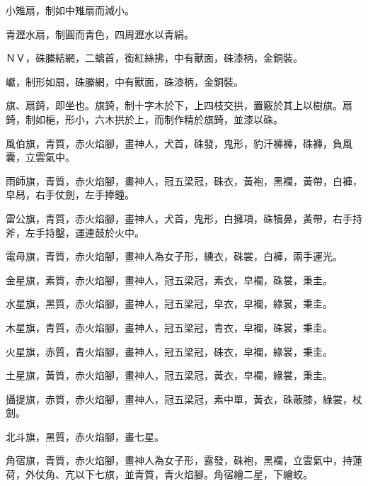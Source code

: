 \begin{pinyinscope}
 小雉扇，制如中雉扇而減小。



 青瀝水扇，制圓而青色，四周瀝水以青絹。



 ＮＶ，硃縢結網，二螭首，銜紅絲拂，中有獸面，硃漆柄，金銅裝。



 巘，制形如扇，硃縢網，中有獸面，硃漆柄，金銅裝。



 旗、扇錡，即坐也。旗錡，制十字木於下，上四枝交拱，置竅於其上以樹旗。扇錡，制如梔，形小，六木拱於上，而制作精於旗錡，並漆以硃。



 風伯旗，青質，赤火焰腳，畫神人，犬首，硃發，鬼形，豹汗褲褲，硃褲，負風囊，立雲氣中。



 雨師旗，青質，赤火焰腳，畫神人，冠五梁冠，硃衣，黃袍，黑襴，黃帶，白褲，皁舄，右手仗劍，左手捧鐘。



 雷公旗，青質，赤火焰腳，畫神人，犬首，鬼形，白擁項，硃犢鼻，黃帶，右手持斧，左手持鑿，運連鼓於火中。



 電母旗，青質，赤火焰腳，畫神人為女子形，纁衣，硃裳，白褲，兩手運光。



 金星旗，素質，赤火焰腳，畫神人，冠五梁冠，素衣，皁襴，硃裳，秉圭。



 水星旗，黑質，赤火焰腳，畫神人，冠五梁冠，皁衣，皁襴，綠裳，秉圭。



 木星旗，青質，赤火焰腳，畫神人，冠五梁冠，青衣，皁襴，硃裳，秉圭。



 火星旗，赤質，青火焰腳，畫神人，冠五梁冠，硃衣，皁襴，綠裳，秉圭。



 土星旗，黃質，赤火焰腳，畫神人，冠五梁冠，黃衣，皁襴，綠裳，秉圭。



 攝提旗，赤質，赤火焰腳，畫神人，冠五梁冠，素中單，黃衣，硃蔽膝，綠裳，杖劍。



 北斗旗，黑質，赤火焰腳，畫七星。



 角宿旗，青質，赤火焰腳，畫神人為女子形，露發，硃袍，黑襴，立雲氣中，持蓮荷，外仗角、亢以下七旗，並青質，青火焰腳。角宿繪二星，下繪蛟。




\end{pinyinscope}
